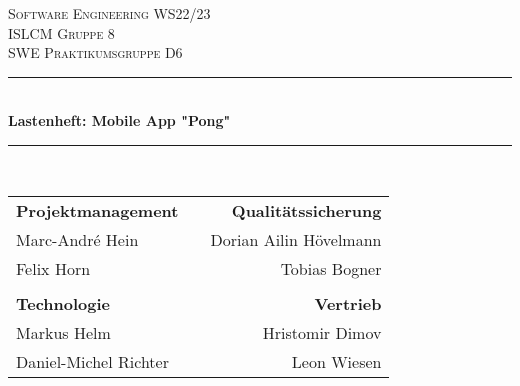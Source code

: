 
\begin{titlepage} %
	\newcommand{\HRule}{\rule{\linewidth}{0.5mm}} %
	
	\center %
	
	
	\textsc{\LARGE Software Engineering WS22/23}\\[1.5cm] %
	
	\textsc{\Large ISLCM Gruppe 8}\\[0.5cm] %
	
	\textsc{\large SWE Praktikumsgruppe D6}\\[0.5cm] %
	
	
	\HRule\\[0.4cm]
	{\huge\bfseries Lastenheft: Mobile App "Pong"}\\[0cm] %
	\HRule\\[0.4cm]
	
	
    \begin{xltabular}{\linewidth}{l X r}
        \textbf{Projektmanagement} & & \textbf{Qualitätssicherung} \\
        Marc-André Hein         & & Dorian Ailin Hövelmann                  \\
        Felix Horn              & & Tobias Bogner               \\
        & & \\
        \textbf{Technologie}    & & \textbf{Vertrieb}           \\
        Markus Helm             & & Hristomir Dimov             \\
        Daniel-Michel Richter   & & Leon Wiesen                 \\
    \end{xltabular}
    \label{tab:table_of_members}
    
    
	

\end{titlepage}
